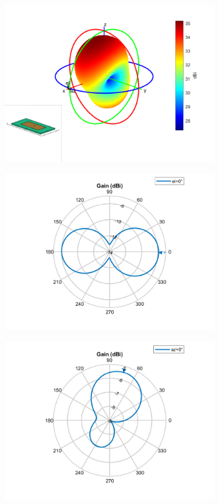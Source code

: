 \documentclass[12pt,a4paper]{article}
\begin{document}
{\begin{figure}[h]
\begin{center}
\begin{subfigure}{0.5\linewidth}
				\includegraphics[scale=0.5]{gain_3D_pifa.pdf}
				\caption{}
			\end{subfigure}
			\begin{subfigure}{0.5\linewidth}
				\includegraphics[scale=0.5]{gain_azimuth_pifa.pdf}
				\caption{}	\end{subfigure}
			\begin{subfigure}{0.5\linewidth}
				\includegraphics[scale=0.5]{gain_elevation_pifa.pdf}

\end{subfigure}
\end{center}
\end{figure}}
\end{document}
